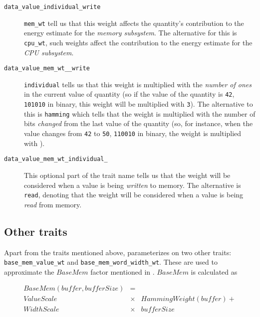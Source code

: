 \begin{description}
\item[\texttt{data\_value\_individual\_write}] \hfill

  \texttt{mem\_wt} tell us that this weight affects the quantity's
  contribution to the energy estimate for the \textit{memory
    subsystem}.  The alternative for this is \texttt{cpu\_wt}, such
  weights affect the contribution to the energy estimate for the
  \textit{CPU subsystem}.

\item[\texttt{data\_value\_mem\_wt\_\_write}] \hfill

  \texttt{individual} tells us that this weight is multiplied with the
  \textit{number of ones} in the current value of quantity (so if the
  value of the quantity is \texttt{42}, \texttt{101010} in binary,
  this weight will be multiplied with \texttt{3}).  The alternative to
  this is \texttt{hamming} which tells that the weight is multiplied
  with the number of bits \textit{changed} from the last value of the
  quantity (so, for instance, when the value changes from \texttt{42}
  to \texttt{50}, \texttt{110010} in binary, the weight is multiplied
  with ).

\item[\texttt{data\_value\_mem\_wt\_individual\_}] \hfill

  This optional part of the trait name tells us that the weight will
  be considered when a value is being \textit{written} to memory.  The
  alternative is \texttt{read}, denoting that the weight will be
  considered when a value is being \textit{read} from memory.
  
\end{description}

\subsection{Other traits}

Apart from the traits mentioned above, \wattage parameterizes on two
other traits: \texttt{base\_mem\_value\_wt} and
\texttt{base\_mem\_word\_width\_wt}.  These are used to approximate
the $BaseMem$ factor mentioned in \cite{steinke}.  $BaseMem$ is
calculated as

\begin{eqnarray*}
  BaseMem(buffer, bufferSize) &=& \\
          ValueScale &\times& HammingWeight(buffer) + \\
          WidthScale &\times& bufferSize
\end{eqnarray*}

